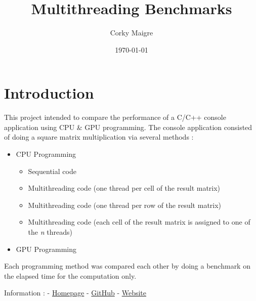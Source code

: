 \documentclass[]{article}
\title{Multithreading Benchmarks}
\author{Corky Maigre}
\date{\today}
\makeatletter
\newcommand*{\toccontents}{\@starttoc{toc}}
\makeatother
\begin{document}
\maketitle


\toccontents





\section{Introduction}\label{introduction}

This project intended to compare the performance of a C/C++ console
application using CPU \& GPU programming. The console application
consisted of doing a square matrix multiplication via several methods :
\begin{itemize}
	\item CPU Programming
	\begin{itemize}
		\item Sequential code
		\item Multithreading code (one thread per cell of the result matrix)
		\item Multithreading code (one thread per row of the result matrix)
		\item Multithreading code (each cell of the result matrix is assigned to one of the \emph{n} threads)
	\end{itemize}
	\item GPU Programming
\end{itemize}


Each programming method was compared each other by doing a benchmark on
the elapsed time for the computation only.

Information : - \href{https://github.com/CorkyMaigre}{Homepage} -
\href{https://github.com/CorkyMaigre/multithreading-benchmarks}{GitHub} - \href{http://www.corkymaigre.be/}{Website}



\end{document}
